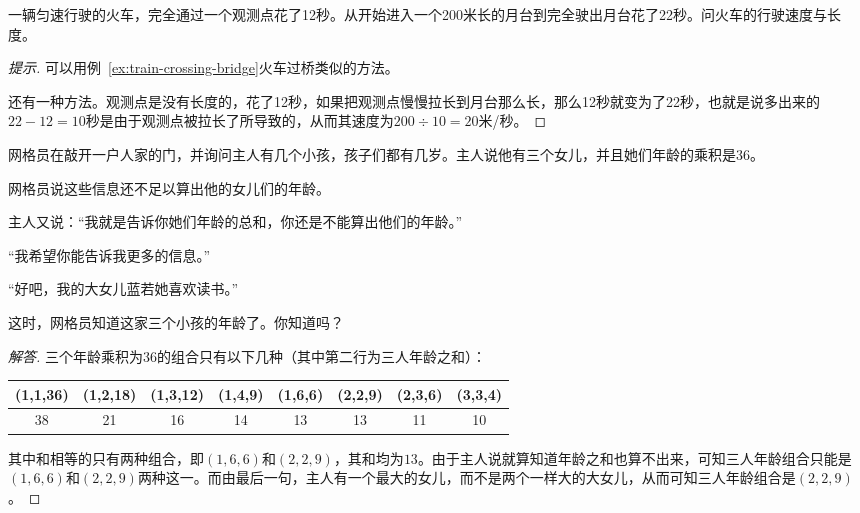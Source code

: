 \begin{example}
  一辆匀速行驶的火车，完全通过一个观测点花了12秒。从开始进入一个200米长的月台到完全驶出月台花了22秒。问火车的行驶速度与长度。
\end{example}
\begin{proof}[提示]
  可以用例~\ref{ex:train-crossing-bridge}火车过桥类似的方法。

  还有一种方法。观测点是没有长度的，花了12秒，如果把观测点慢慢拉长到月台那么长，那么12秒就变为了22秒，也就是说多出来的$22-12=10$秒是由于观测点被拉长了所导致的，从而其速度为$200\div10=20$米/秒。
\end{proof}

\begin{example}[户口调查员]
  网格员在敲开一户人家的门，并询问主人有几个小孩，孩子们都有几岁。主人说他有三个女儿，并且她们年龄的乘积是$36$。

  网格员说这些信息还不足以算出他的女儿们的年龄。

  主人又说：“我就是告诉你她们年龄的总和，你还是不能算出他们的年龄。”

  “我希望你能告诉我更多的信息。”

  “好吧，我的大女儿蓝若她喜欢读书。”

  这时，网格员知道这家三个小孩的年龄了。你知道吗？
\end{example}
\begin{proof}[解答]
  三个年龄乘积为$36$的组合只有以下几种（其中第二行为三人年龄之和）：

\begin{center}
\begin{tabular}{cccccccc}
  \hline
  (1,1,36) & (1,2,18) & (1,3,12) & (1,4,9) & (1,6,6) & (2,2,9) & (2,3,6) & (3,3,4)\\
  \hline
  38       & 21       & 16       & 14      & 13      & 13      & 11      & 10\\
  \hline
\end{tabular}
\end{center}

其中和相等的只有两种组合，即$(1,6,6)$和$(2,2,9)$，其和均为$13$。由于主人说就算知道年龄之和也算不出来，可知三人年龄组合只能是$(1,6,6)$和$(2,2,9)$两种这一。而由最后一句，主人有一个最大的女儿，而不是两个一样大的大女儿，从而可知三人年龄组合是$(2,2,9)$。
\end{proof}

